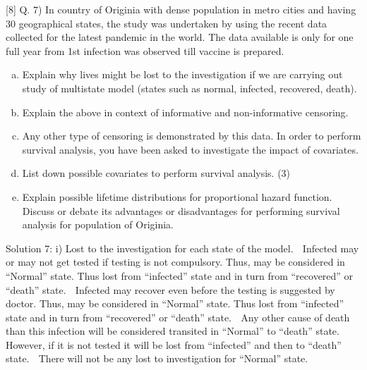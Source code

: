 \documentclass[a4paper,12pt]{article}
\begin{document}
[8]
Q. 7) In country of Originia with dense population in metro cities and having 30 geographical
states, the study was undertaken by using the recent data collected for the latest pandemic
in the world. The data available is only for one full year from 1st infection was observed
till vaccine is prepared.

\begin{enumerate}[(a)]
\item  Explain why lives might be lost to the investigation if we are carrying out study of
multistate model (states such as normal, infected, recovered, death). 
\item   Explain the above in context of informative and non-informative censoring. 
\item    Any other type of censoring is demonstrated by this data. 
In order to perform survival analysis, you have been asked to investigate the impact of
covariates.
\item  List down possible covariates to perform survival analysis. (3)
\item  Explain possible lifetime distributions for proportional hazard function. Discuss or
debate its advantages or disadvantages for performing survival analysis for
population of Originia. 
\end{enumerate}





Solution 7:
i)
Lost to the investigation for each state of the model.
 Infected may or may not get tested if testing is not compulsory. Thus, may be considered in “Normal”
state. Thus lost from “infected” state and in turn from “recovered” or “death” state.
 Infected may recover even before the testing is suggested by doctor. Thus, may be considered in
“Normal” state. Thus lost from “infected” state and in turn from “recovered” or “death” state.
 Any other cause of death than this infection will be considered transited in “Normal” to “death” state.
However, if it is not tested it will be lost from “infected” and then to “death” state.
 There will not be any lost to investigation for “Normal” state.
\end{document}
